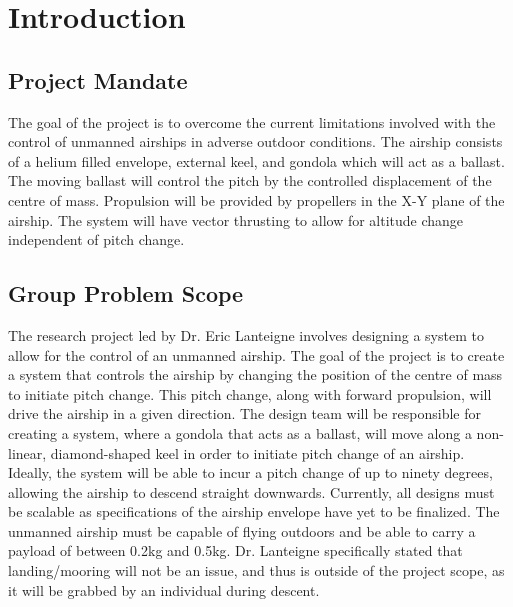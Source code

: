 \documentclass[../main.tex]{subfiles}
\begin{document}
\chapter{Introduction}
\section{Project Mandate} \label{Mandate}
The goal of the project is to overcome the current limitations involved with the control of unmanned airships in adverse outdoor conditions. The airship consists of a helium filled envelope, external keel, and gondola which will act as a ballast. The moving ballast will control the pitch by the controlled displacement of the centre of mass. Propulsion will be provided by propellers in the X-Y plane of the airship. The system will have vector thrusting to allow for altitude change independent of pitch change.

\section{Group Problem Scope} \label{Scope}
The research project led by Dr. Eric Lanteigne involves designing a system to allow for the control of an unmanned airship. The goal of the project is to create a system that controls the airship by changing the position of the centre of mass to initiate pitch change. This pitch change, along with forward propulsion, will drive the airship in a given direction. The design team will be responsible for creating a system, where a gondola that acts as a ballast, will move along a non-linear, diamond-shaped keel in order to initiate pitch change of an airship. Ideally, the system will be able to incur a pitch change of up to ninety degrees, allowing the airship to descend straight downwards. Currently, all designs must be scalable as specifications of the airship envelope have yet to be finalized. The unmanned airship must be capable of flying outdoors and be able to carry a payload of between 0.2kg and 0.5kg. Dr. Lanteigne specifically stated that landing/mooring will not be an issue, and thus is outside of the project scope, as it will be grabbed by an individual during descent.

\end{document}
